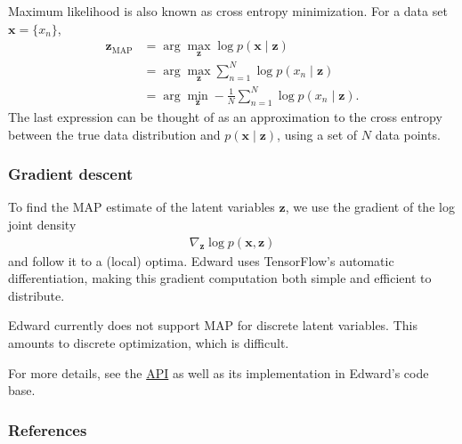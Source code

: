 Maximum likelihood is also known as cross entropy minimization. For a
data set $\mathbf{x}=\{x_n\}$,
\begin{align*}
  \mathbf{z}_\text{MAP}
  &=
  \arg \max_\mathbf{z}
  \log p(\mathbf{x}\mid \mathbf{z})
  \\
  &=
  \arg \max_\mathbf{z}
  \sum_{n=1}^N \log p(x_n\mid \mathbf{z})
  \\
  &=
  \arg \min_\mathbf{z}
  -\frac{1}{N}\sum_{n=1}^N \log p(x_n\mid \mathbf{z}).
\end{align*}
The last expression can be thought of as an approximation to the cross
entropy between the true data distribution and $p(\mathbf{x}\mid \mathbf{z})$,
using a set of $N$ data points.

\subsubsection{Gradient descent}

To find the MAP estimate of the latent variables $\mathbf{z}$, we use
the gradient of the log joint density
\begin{align*}
  \nabla_\mathbf{z}
  \log p(\mathbf{x}, \mathbf{z})
\end{align*}
and follow it to a (local) optima.
Edward uses TensorFlow's automatic differentiation, making this gradient
computation both simple and efficient to distribute.

Edward currently does not support MAP for discrete latent variables.
This amounts to discrete optimization, which is difficult.

For more details, see the \href{/api/}{API} as well as its
implementation in Edward's code base.

\subsubsection{References}\label{references}
